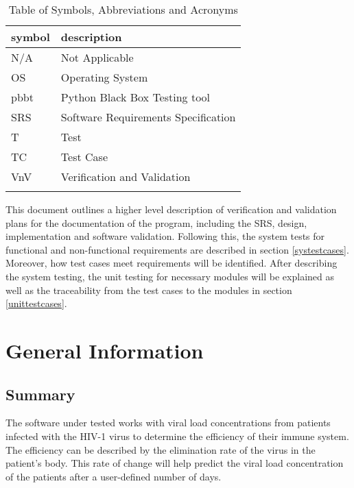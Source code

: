 \documentclass[12pt, titlepage]{article}
\begin{document}
\begin{table}[H]
\renewcommand{\arraystretch}{1.2}
\noindent \begin{longtable*}{l p{8cm}} \toprule
\textbf{symbol} & \textbf{description}\\
\midrule 
N/A & Not Applicable
\\
OS & Operating System
\\
pbbt & Python Black Box Testing tool
\\
SRS & Software Requirements Specification
\\
T & Test 
\\
TC & Test Case 
\\
VnV & Verification and Validation 
\\
&\\
\bottomrule

\end{longtable*}
\caption{Table of Symbols, Abbreviations and Acronyms}
\end{table}


\newpage


This document outlines a higher level description of verification and validation plans for the documentation of the \progname{} program, including the 
SRS, design, implementation and software validation. Following this, the system 
tests for functional and non-functional requirements are described in section \ref{systestcases}. Moreover, 
how test cases meet requirements will be identified. After describing the system 
testing, the unit testing for necessary modules will be 
explained as well as the traceability from the test cases to the modules in section \ref{unittestcases}.

\section{General Information}

\subsection{Summary}

The software under tested works with viral load concentrations from patients 
infected with the HIV-1 virus to determine the efficiency of their immune 
system. 
The efficiency can be described by the elimination rate of the virus in the 
patient's body.
This rate of change will help predict the viral load concentration of the 
patients after a user-defined number of days. 
\end{document}
